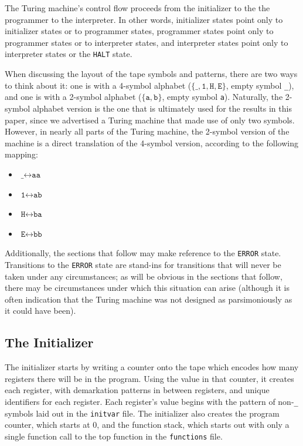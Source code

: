 \documentclass[11pt]{article}
\begin{document}
The Turing machine's control flow proceeds from the initializer to the the programmer to the interpreter. In other words, initializer states point only to initializer states or to programmer states, programmer states point only to programmer states or to interpreter states, and interpreter states point only to interpreter states or the \texttt{HALT} state. 

When discussing the layout of the tape symbols and patterns, there are two ways to think about it: one is with a 4-symbol alphabet ($\{\texttt{\_}, \texttt{1}, \texttt{H}, \texttt{E}\}$, empty symbol \texttt{\_}), and one is with a 2-symbol alphabet ($\{\texttt{a}, \texttt{b}\}$, empty symbol \texttt{a}). Naturally, the 2-symbol alphabet version is the one that is ultimately used for the results in this paper, since we advertised a Turing machine that made use of only two symbols. However, in nearly all parts of the Turing machine, the 2-symbol version of the machine is a direct translation of the 4-symbol version, according to the following mapping:

\begin{itemize}
\item $\texttt{\_} \leftrightarrow \texttt{aa}$
\item $\texttt{1} \leftrightarrow \texttt{ab}$
\item $\texttt{H} \leftrightarrow \texttt{ba}$
\item $\texttt{E} \leftrightarrow \texttt{bb}$
\end{itemize}

Additionally, the sections that follow may make reference to the \texttt{ERROR} state. Transitions to the \texttt{ERROR} state are stand-ins for transitions that will never be taken under any circumstances; as will be obvious in the sections that follow, there may be circumstances under which this situation can arise (although it is often indication that the Turing machine was not designed as parsimoniously as it could have been).

\subsection{The Initializer}

The initializer starts by writing a counter onto the tape which encodes how many registers there will be in the program. Using the value in that counter, it creates each register, with demarkation patterns in between registers, and unique identifiers for each register. Each register's value begins with the pattern of non-\texttt{\_} symbols laid out in the \texttt{initvar} file. The initializer also creates the program counter, which starts at 0, and the function stack, which starts out with only a single function call to the top function in the \texttt{functions} file.
\end{document}
